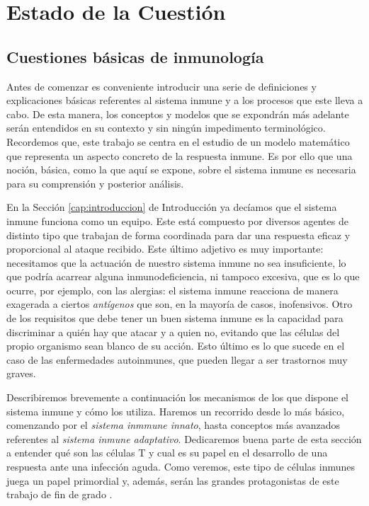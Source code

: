 \chapter{Estado de la Cuestión}
\label{cap:estadoDeLaCuestion}




\section{Cuestiones básicas de inmunología}
\label{sec:cuestInmuno}

Antes de comenzar es conveniente introducir una serie de definiciones y explicaciones básicas referentes al sistema inmune y a los procesos que este lleva a cabo. De esta manera, los conceptos y modelos que se expondrán más adelante serán entendidos en su contexto y sin ningún impedimento terminológico. Recordemos que, este trabajo se centra en el estudio de un modelo matemático que representa un aspecto concreto de la respuesta inmune. Es por ello que una noción, básica, como la que aquí se expone, sobre el sistema inmune es necesaria para su comprensión y posterior análisis.

En la Sección \ref{cap:introduccion} de Introducción ya decíamos que el sistema inmune funciona como un equipo. Este está compuesto por diversos agentes de distinto tipo que trabajan de forma coordinada para dar una respuesta eficaz y proporcional al ataque recibido. Este último adjetivo es muy importante: necesitamos que la actuación de nuestro sistema inmune no sea insuficiente, lo que podría acarrear alguna inmunodeficiencia, ni tampoco excesiva, que es lo que ocurre, por ejemplo, con las alergias: el sistema inmune reacciona de manera exagerada a ciertos \textit{antígenos} que son, en la mayoría de casos, inofensivos. Otro de los requisitos que debe tener un buen sistema inmune es la capacidad para discriminar a quién hay que atacar y a quien no, evitando que las células del propio organismo sean blanco de su acción. Esto último es lo que sucede en el caso de las enfermedades autoinmunes, que pueden llegar a ser trastornos muy graves.

Describiremos brevemente a continuación los mecanismos de los que dispone el sistema inmune y cómo los utiliza. Haremos un recorrido desde lo más básico, comenzando por el \textit{sistema inmmune innato}, hasta conceptos más avanzados referentes al \textit{sistema inmune adaptativo}. Dedicaremos buena parte de esta sección a entender qué son las células T y cual es su papel en el desarrollo de una respuesta ante una infección aguda. Como veremos, este tipo de células inmunes juega un papel primordial y, además, serán las grandes protagonistas de este trabajo de fin de grado \citep{JTB}.  

